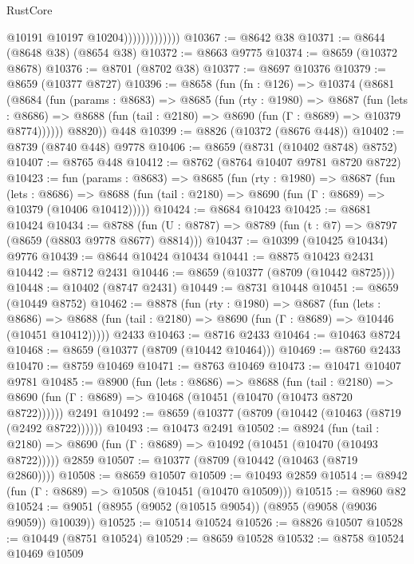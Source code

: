 \begin{lexlean}{RustCore}
\begin{coremodule}
                              @10191
                              @10197
                              @10204)))))))))))))
@10367 := @8642 @38
@10371 := @8644 (@8648 @38) (@8654 @38)
@10372 := @8663 @9775
@10374 := @8659 (@10372 @8678)
@10376 := @8701 (@8702 @38)
@10377 := @8697 @10376
@10379 := @8659 (@10377 @8727)
@10396 := @8658
    (fun (fn : @126) =>
    @10374
      (@8681
        (@8684
          (fun (params : @8683) =>
          @8685
            (fun (rty : @1980) =>
            @8687
              (fun (lets : @8686) =>
              @8688 (fun (tail : @2180) => @8690 (fun (Γ : @8689) => @10379 @8774))))))
        @8820))
    @448
@10399 := @8826 (@10372 (@8676 @448))
@10402 := @8739 (@8740 @448) @9778
@10406 := @8659 (@8731 (@10402 @8748) @8752)
@10407 := @8765 @448
@10412 := @8762 (@8764 @10407 @9781 @8720 @8722)
@10423 := fun (params : @8683) =>
  @8685
    (fun (rty : @1980) =>
    @8687
      (fun (lets : @8686) =>
      @8688 (fun (tail : @2180) => @8690 (fun (Γ : @8689) => @10379 (@10406 @10412)))))
@10424 := @8684 @10423
@10425 := @8681 @10424
@10434 := @8788 (fun (U : @8787) => @8789 (fun (t : @7) => @8797 (@8659 (@8803 @9778 @8677) @8814)))
@10437 := @10399 (@10425 @10434) @9776
@10439 := @8644 @10424 @10434
@10441 := @8875 @10423 @2431
@10442 := @8712 @2431
@10446 := @8659 (@10377 (@8709 (@10442 @8725)))
@10448 := @10402 (@8747 @2431)
@10449 := @8731 @10448
@10451 := @8659 (@10449 @8752)
@10462 := @8878
    (fun (rty : @1980) =>
    @8687
      (fun (lets : @8686) =>
      @8688 (fun (tail : @2180) => @8690 (fun (Γ : @8689) => @10446 (@10451 @10412)))))
    @2433
@10463 := @8716 @2433
@10464 := @10463 @8724
@10468 := @8659 (@10377 (@8709 (@10442 @10464)))
@10469 := @8760 @2433
@10470 := @8759 @10469
@10471 := @8763 @10469
@10473 := @10471 @10407 @9781
@10485 := @8900
    (fun (lets : @8686) =>
    @8688
      (fun (tail : @2180) =>
      @8690 (fun (Γ : @8689) => @10468 (@10451 (@10470 (@10473 @8720 @8722))))))
    @2491
@10492 := @8659 (@10377 (@8709 (@10442 (@10463 (@8719 (@2492 @8722))))))
@10493 := @10473 @2491
@10502 := @8924
    (fun (tail : @2180) => @8690 (fun (Γ : @8689) => @10492 (@10451 (@10470 (@10493 @8722)))))
    @2859
@10507 := @10377 (@8709 (@10442 (@10463 (@8719 @2860))))
@10508 := @8659 @10507
@10509 := @10493 @2859
@10514 := @8942 (fun (Γ : @8689) => @10508 (@10451 (@10470 @10509)))
@10515 := @8960 @82
@10524 := @9051 (@8955 (@9052 (@10515 @9054)) (@8955 (@9058 (@9036 @9059)) @10039))
@10525 := @10514 @10524
@10526 := @8826 @10507
@10528 := @10449 (@8751 @10524)
@10529 := @8659 @10528
@10532 := @8758 @10524 @10469 @10509

\end{coremodule}
\end{lexlean}
